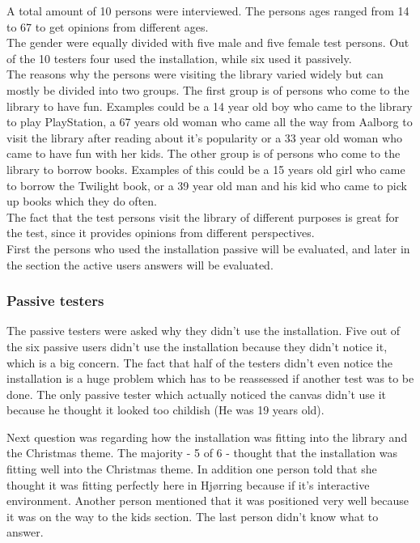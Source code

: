 A total amount of 10 persons were interviewed. The persons ages ranged from 14 to 67 to get opinions from different ages.\\
The gender were equally divided with five male and five female test persons. Out of the 10 testers four used the installation, while six used it passively.\\
The reasons why the persons were visiting the library varied widely but can mostly be divided into two groups. The first group is of persons who come to the library to have fun. Examples could be a 14 year old boy who came to the library to play PlayStation, a 67 years old woman who came all the way from Aalborg to visit the library after reading about it's popularity or a 33 year old woman who came to have fun with her kids. The other group is of persons who come to the library to borrow books. Examples of this could be a 15 years old girl who came to borrow the Twilight book, or a 39 year old man and his kid who came to pick up books which they do often.\\
The fact that the test persons visit the library of different purposes is great for the test, since it provides opinions from different perspectives.\\
First the persons who used the installation passive will be evaluated, and later in the section the active users answers will be evaluated.\\

\subsubsection{Passive testers}
The passive testers were asked why they didn't use the installation. Five out of the six passive users didn't use the installation because they didn't notice it, which is a big concern. The fact that half of the testers didn't even notice the installation is a huge problem which has to be reassessed if another test was to be done. The only passive tester which actually noticed the canvas didn't use it because he thought it looked too childish (He was 19 years old).

Next question was regarding how the installation was fitting into the library and the Christmas theme. The majority - 5 of 6 - thought that the installation was fitting well into the Christmas theme. In addition one person told that she thought it was fitting perfectly here in Hj{\o}rring because if it's interactive environment. Another person mentioned that it was positioned very well because it was on the way to the kids section.
The last person didn't know what to answer.

